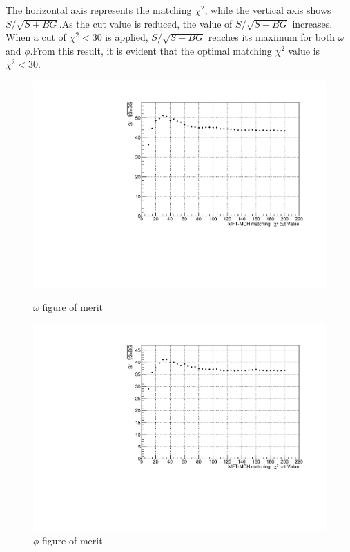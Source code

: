             The horizontal axis represents the matching \(\chi^2\), while the vertical axis shows \(S/\sqrt{S+BG}\).\@ As the cut value is reduced, the value of \(S/\sqrt{S+BG}\) increases. When a cut of \(\chi^2<30\) is applied, \(S/\sqrt{S+BG}\) reaches its maximum for both \(\omega\) and \(\phi\).\@ From this result, it is evident that the optimal matching \(\chi^2\) value is \(\chi^2<30\).\@
            \begin{figure}[htbp]
                \centering
                \begin{minipage}{0.45\textwidth} %
                    \centering
                    \includegraphics[width=\textwidth]{fig/3_4_4_omega_significance.pdf} %
                    \caption{$\omega$ figure of merit}
                    \label{fig:omega_significance}
                \end{minipage}
                \hfill
                \begin{minipage}{0.45\textwidth}
                    \centering
                    \includegraphics[width=\textwidth]{fig/3_4_4_phi_significance.pdf} %
                    \caption{$\phi$ figure of merit}
                    \label{fig:phi_significance}
                \end{minipage}
            \end{figure}


